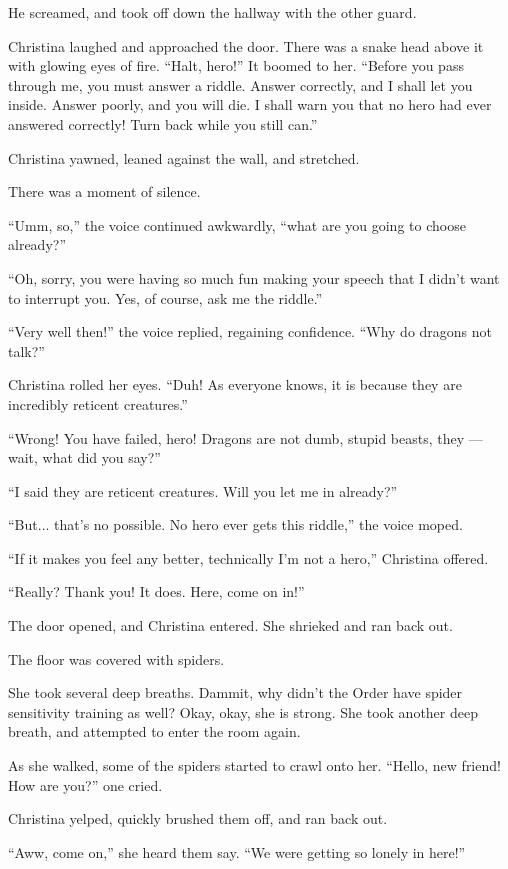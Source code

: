 \documentclass[showtrims,b6paper,draft,10pt]{memoir}
\begin{document}
He screamed, and took off down the hallway with the other guard.

Christina laughed and approached the door.  There was a snake head above it with glowing eyes of fire.  ``Halt, hero!''  It boomed to her.  ``Before you pass through me, you must answer a riddle.  Answer correctly, and I shall let you inside.  Answer poorly, and you will die.  I shall warn you that no hero had ever answered correctly!  Turn back while you still can.''

Christina yawned, leaned against the wall, and stretched.

There was a moment of silence.

``Umm, so,'' the voice continued awkwardly, ``what are you going to choose already?''

``Oh, sorry, you were having so much fun making your speech that I didn't want to interrupt you.  Yes, of course, ask me the riddle.''

``Very well then!'' the voice replied, regaining confidence.  ``Why do dragons not talk?''

Christina rolled her eyes.  ``Duh!  As everyone knows, it is because they are incredibly reticent creatures.''

``Wrong!  You have failed, hero!  Dragons are not dumb, stupid beasts, they --- wait, what did you say?''

``I said they are reticent creatures.  Will you let me in already?''

``But... that's no possible.  No hero ever gets this riddle,'' the voice moped.

``If it makes you feel any better, technically I'm not a hero,'' Christina offered.

``Really?  Thank you!  It does.  Here, come on in!''

The door opened, and Christina entered.  She shrieked and ran back out.

The floor was covered with spiders.

She took several deep breaths.  Dammit, why didn't the Order have spider sensitivity training as well?  Okay, okay, she is strong.  She took another deep breath, and attempted to enter the room again.

As she walked, some of the spiders started to crawl onto her.  ``Hello, new friend!  How are you?'' one cried.

Christina yelped, quickly brushed them off, and ran back out.

``Aww, come on,'' she heard them say.  ``We were getting so lonely in here!''
\end{document}
